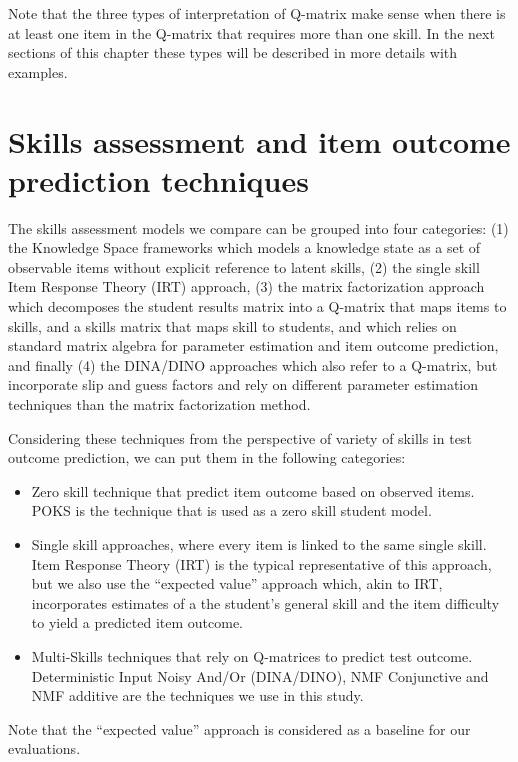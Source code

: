 Note that the three types of interpretation of Q-matrix make sense when there is at least one item in the Q-matrix that requires more than one skill. In the next sections of this chapter these types will be described in more details with examples.

\section{Skills assessment and item outcome prediction techniques}

The skills assessment models we compare can be grouped into four categories: (1) the Knowledge Space frameworks which models a knowledge state as a set of observable items without explicit reference to latent skills, (2) the single skill Item Response Theory (IRT) approach, (3) the matrix factorization approach which decomposes the student results matrix into a Q-matrix that maps items to skills, and a skills matrix that maps skill to students, and which relies on standard matrix algebra for parameter estimation and item outcome prediction, and finally (4) the DINA/DINO approaches which also refer to a Q-matrix, but incorporate slip and guess factors and rely on different parameter estimation techniques than the matrix factorization method.

Considering  these techniques from the perspective of variety of skills in test outcome prediction, we can put them in the following categories: 

\begin{itemize}

\item Zero skill technique that predict item outcome based on observed items. POKS is the technique that is used as a zero skill student model.
\item Single skill approaches, where every item is linked to the same single skill. Item Response Theory (IRT) is the typical representative of this approach, but we also use the ``expected value'' approach which, akin to IRT, incorporates estimates of a the student's general skill and the item difficulty to yield a predicted item outcome.
\item Multi-Skills techniques that rely on Q-matrices to predict test outcome.  Deterministic Input Noisy And/Or (DINA/DINO), NMF Conjunctive and \ac{NMF} additive are the techniques we use in this study.

\end{itemize}  
Note that the ``expected value'' approach is considered as a baseline for our evaluations. 

